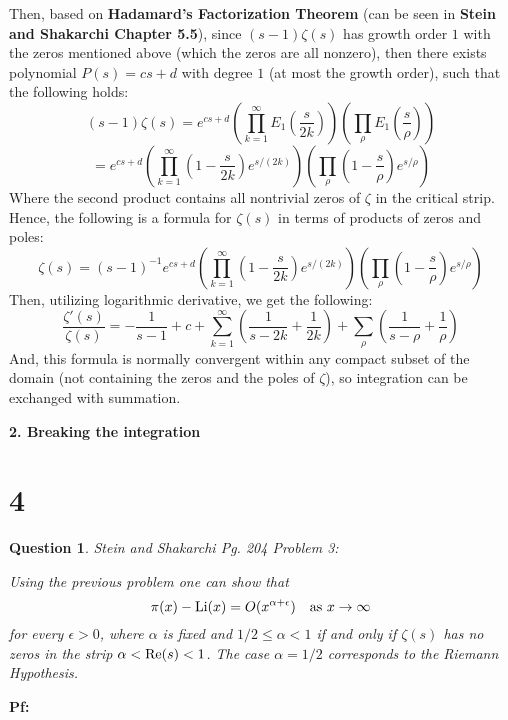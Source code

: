 \documentclass{article}
\newtheorem{question}{Question}
\begin{document}
Then, based on \textbf{Hadamard's Factorization Theorem} (can be seen in \textbf{Stein and Shakarchi Chapter 5.5}), since $(s-1)\zeta(s)$ has growth order $1$ with the zeros mentioned above (which the zeros are all nonzero), then there exists polynomial $P(s) = cs+d$ with degree $1$ (at most the growth order), such that the following holds:
$$(s-1)\zeta(s)=e^{cs+d}\left(\prod_{k=1}^{\infty}E_1\left(\frac{s}{2k}\right)\right)\left(\prod_{\rho}E_1\left(\frac{s}{\rho}\right)\right)$$
$$ = e^{cs+d}\left(\prod_{k=1}^{\infty}\left(1-\frac{s}{2k}\right)e^{s/(2k)}\right)\left(\prod_{\rho}\left(1-\frac{s}{\rho}\right)e^{s/\rho}\right)$$
Where the second product contains all nontrivial zeros of $\zeta$ in the critical strip. Hence, the following is a formula for $\zeta(s)$ in terms of products of zeros and poles:
$$\zeta(s) = (s-1)^{-1}e^{cs+d}\left(\prod_{k=1}^{\infty}\left(1-\frac{s}{2k}\right)e^{s/(2k)}\right)\left(\prod_{\rho}\left(1-\frac{s}{\rho}\right)e^{s/\rho}\right)$$
Then, utilizing logarithmic derivative, we get the following:
$$\frac{\zeta'(s)}{\zeta(s)} = -\frac{1}{s-1}+c+\sum_{k=1}^{\infty}\left(\frac{1}{s-2k}+\frac{1}{2k}\right) + \sum_{\rho}\left(\frac{1}{s-\rho}+\frac{1}{\rho}\right)$$
And, this formula is normally convergent within any compact subset of the domain (not containing the zeros and the poles of $\zeta$), so integration can be exchanged with summation.

\hfil

\textbf{2. Breaking the integration }

\break

\section*{4}
\begin{myBox}[]{}
    \begin{question}
        Stein and Shakarchi Pg. 204 Problem 3:

        Using the previous problem one can show that 
        $$\pi(x)-\textmd{Li}(x)=O(x^{\alpha+\epsilon})\quad \textmd{as }x\rightarrow\infty$$
        for every $\epsilon>0$, where $\alpha$ is fixed and $1/2\leq \alpha<1$ if and only if $\zeta(s)$ has no zeros in the strip $\alpha<\textmd{Re}(s)<1$. The case $\alpha=1/2$ corresponds to the Riemann Hypothesis.     
    \end{question}
\end{myBox}

\textbf{Pf:}
\end{document}
